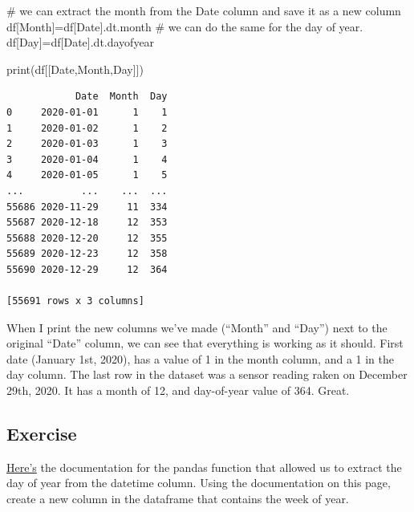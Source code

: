 \documentclass[
  letterpaper,
  DIV=11,
  numbers=noendperiod]{scrreprt}
\newenvironment{Shaded}{\begin{snugshade}}{\end{snugshade}}
\newcommand{\BuiltInTok}[1]{\textcolor[rgb]{0.00,0.23,0.31}{#1}}
\newcommand{\CommentTok}[1]{\textcolor[rgb]{0.37,0.37,0.37}{#1}}
\newcommand{\NormalTok}[1]{\textcolor[rgb]{0.00,0.23,0.31}{#1}}
\newcommand{\OperatorTok}[1]{\textcolor[rgb]{0.37,0.37,0.37}{#1}}
\newcommand{\StringTok}[1]{\textcolor[rgb]{0.13,0.47,0.30}{#1}}
\begin{document}
\begin{Shaded}
\begin{Highlighting}[]
\CommentTok{\# we can extract the month from the Date column and save it as a new column }
\NormalTok{df[}\StringTok{\textquotesingle{}Month\textquotesingle{}}\NormalTok{]}\OperatorTok{=}\NormalTok{df[}\StringTok{\textquotesingle{}Date\textquotesingle{}}\NormalTok{].dt.month}
\CommentTok{\# we can do the same for the day of year. }
\NormalTok{df[}\StringTok{\textquotesingle{}Day\textquotesingle{}}\NormalTok{]}\OperatorTok{=}\NormalTok{df[}\StringTok{\textquotesingle{}Date\textquotesingle{}}\NormalTok{].dt.dayofyear}

\BuiltInTok{print}\NormalTok{(df[[}\StringTok{\textquotesingle{}Date\textquotesingle{}}\NormalTok{,}\StringTok{\textquotesingle{}Month\textquotesingle{}}\NormalTok{,}\StringTok{\textquotesingle{}Day\textquotesingle{}}\NormalTok{]])}
\end{Highlighting}
\end{Shaded}

\begin{verbatim}
            Date  Month  Day
0     2020-01-01      1    1
1     2020-01-02      1    2
2     2020-01-03      1    3
3     2020-01-04      1    4
4     2020-01-05      1    5
...          ...    ...  ...
55686 2020-11-29     11  334
55687 2020-12-18     12  353
55688 2020-12-20     12  355
55689 2020-12-23     12  358
55690 2020-12-29     12  364

[55691 rows x 3 columns]
\end{verbatim}

When I print the new columns we've made (``Month'' and ``Day'') next to
the original ``Date'' column, we can see that everything is working as
it should. First date (January 1st, 2020), has a value of 1 in the month
column, and a 1 in the day column. The last row in the dataset was a
sensor reading raken on December 29th, 2020. It has a month of 12, and
day-of-year value of 364. Great.

\hypertarget{exercise-3}{%
\subsection{Exercise}\label{exercise-3}}

\href{https://pandas.pydata.org/docs/reference/api/pandas.Series.dt.dayofyear.html}{Here's}
the documentation for the pandas function that allowed us to extract the
day of year from the datetime column. Using the documentation on this
page, create a new column in the dataframe that contains the week of
year.
\end{document}
